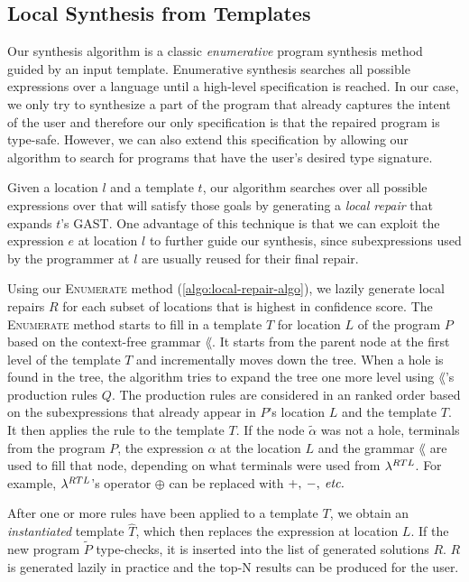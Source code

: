 \subsection{Local Synthesis from Templates}
\label{subsec:local-synthesis}

Our synthesis algorithm is a classic \emph{enumerative} program synthesis method
guided by an input template. Enumerative synthesis searches all possible
expressions over a language until a high-level
specification is reached. In our case, we only try to synthesize a part of the
program that already captures the intent of the user and therefore our only
specification is that the repaired program is type-safe. However, we can also
extend this specification by allowing our algorithm to search for programs that
have the user's desired type signature.

Given a location $l$ and a template $t$, our algorithm searches over all
possible expressions over \lang that will satisfy those goals by generating a
\emph{local repair} that expands $t$'s GAST. One advantage of this technique
is that we can exploit the expression $e$ at location $l$ to further guide our
synthesis, since subexpressions used by the programmer at $l$ are usually reused
for their final repair.



Using our \textsc{Enumerate} method (\autoref{algo:local-repair-algo}), we lazily generate local repairs $R$ for
each subset of locations that is highest in confidence score. The
\textsc{Enumerate} method starts to fill in a template $T$ for location $L$ of
the program $P$ based on the context-free grammar $\lang$. It starts from the
parent node at the first level of the template $T$ and incrementally moves
down the tree. When a hole is found in the tree, the algorithm tries to expand
the tree one more level using $\lang$'s production rules $Q$. The production
rules are considered in an ranked order based on the subexpressions that already
appear in $P$'s location $L$ and the template $T$. It then applies the rule to the
template $T$. If the node $\tilde{\alpha}$ was not a hole, terminals from the
program $P$, the expression $\alpha$ at the location $L$ and the grammar
$\lang$ are used to fill that node, depending on what terminals were used from
$\lambda^{RTL}$. For example, $\lambda^{RTL}$'s operator $\oplus$ can be replaced
with $+,\:-,\:\textit{etc.}$

After one or more rules have been applied to a 
template $T$, we obtain an
\emph{instantiated} template $\hat{T}$, which then replaces the expression at
location $L$. If the new program $\tilde{P}$ type-checks, it is inserted into
the list of generated solutions $R$. $R$ is
generated lazily in practice and the top-N results can be produced for the user. 



